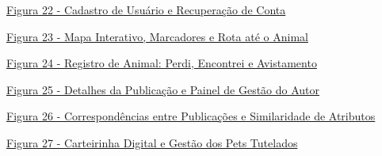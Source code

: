 \noindent \hyperref[fig:tela_cadastro_recuperacao]{Figura 22 - Cadastro de Usuário e Recuperação de Conta \dotfill \pageref{fig:tela_cadastro_recuperacao}}\par\vspace{0.12cm}
\noindent \hyperref[fig:tela_mapa]{Figura 23 - Mapa Interativo, Marcadores e Rota até o Animal \dotfill \pageref{fig:tela_mapa}}\par\vspace{0.12cm}
\noindent \hyperref[fig:tela_registro_perdi_encontrei]{Figura 24 - Registro de Animal: Perdi, Encontrei e Avistamento \dotfill \pageref{fig:tela_registro_perdi_encontrei}}\par\vspace{0.12cm}
\noindent \hyperref[fig:tela_detalhes]{Figura 25 - Detalhes da Publicação e Painel de Gestão do Autor \dotfill \pageref{fig:tela_detalhes}}\par\vspace{0.12cm}
\noindent \hyperref[fig:tela_correspondencias]{Figura 26 - Correspondências entre Publicações e Similaridade de Atributos \dotfill \pageref{fig:tela_correspondencias}}\par\vspace{0.12cm}
\noindent \hyperref[fig:tela_meus_pets_rg]{Figura 27 - Carteirinha Digital e Gestão dos Pets Tutelados \dotfill \pageref{fig:tela_meus_pets_rg}}\par

\clearpage
